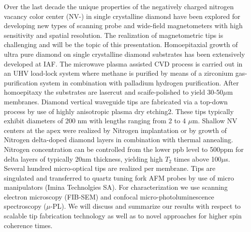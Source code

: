 Over the last decade the unique properties of the negatively charged nitrogen vacancy color center (NV-) in single crystalline diamond have been explored for developing new types of scanning probe and wide-field magnetometers with high sensitivity and spatial resolution. The realization of magnetometric tips is challenging and will be the topic of this presentation.
Homoepitaxial growth of ultra pure diamond on single crystalline diamond substrates has been extensively developed at IAF\cite{Widmann_2016}. The microwave plasma assisted CVD process is carried out in an UHV load-lock system where methane is purified by means of a zirconium gas-purification system in combination with palladium hydrogen purification. After homoepitaxy the substrates are lasercut and scaife-polished to yield 30-50$\mu$m membranes. Diamond vertical waveguide tips are fabricated via a top-down process by use of highly anisotropic plasma dry etching2. These tips typically exhibit diameters of 200 nm with lengths ranging from 2 to 4 $\mu$m\cite{Widmann_2015}. Shallow NV centers at the apex were realized by Nitrogen implantation or by growth of Nitrogen delta-doped diamond layers in combination with thermal annealing. Nitrogen concentration can be controlled from the lower ppb level to 500ppm for delta layers of typically 20nm thickness, yielding high $T_2$ times above 100$\mu$s. Several hundred micro-optical tips are realized per membrane. Tips are singulated and transferred to quartz tuning fork AFM probes by use of micro manipulators (Imina Technolgies SA). For characterization we use scanning electron microscopy (FIB-SEM) and confocal micro-photoluminescence spectroscopy ($\mu$-PL). We will discuss and summarize our results with respect to scalable tip fabrication technology as well as to novel approaches for higher spin coherence times.